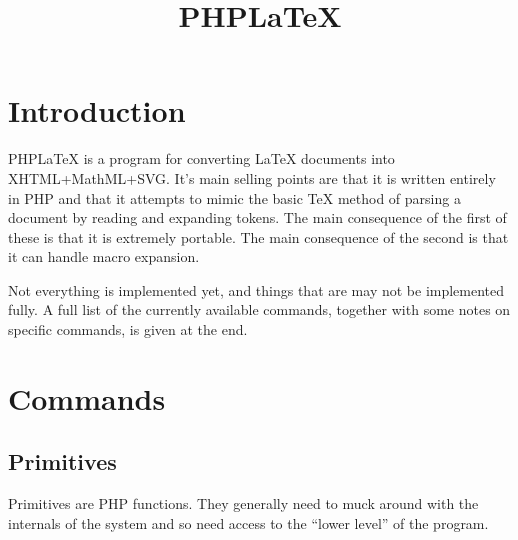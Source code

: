 \documentclass{webpage}
\title{PHPLaTeX}
\begin{document}
\section{Introduction}

PHPLaTeX is a program for converting LaTeX documents into XHTML+MathML+SVG.
It's main selling points are that it is written entirely in PHP and that it attempts to mimic the basic TeX method of parsing a document by reading and expanding tokens.
The main consequence of the first of these is that it is extremely portable.
The main consequence of the second is that it can handle macro expansion.

Not everything is implemented yet, and things that are may not be implemented fully.
A full list of the currently available commands, together with some notes on specific commands, is given at the end.

\section{Commands}

\subsection{Primitives}

Primitives are PHP functions.
They generally need to muck around with the internals of the system and so need access to the ``lower level'' of the program.
\end{document}
